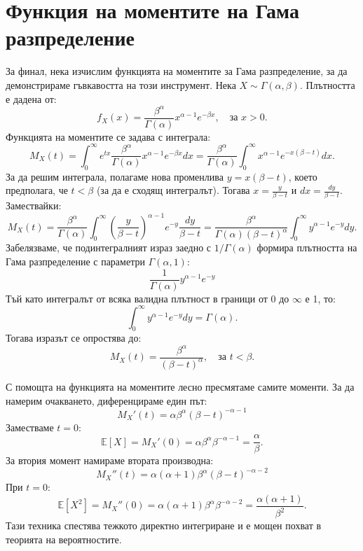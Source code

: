 \documentclass{article}
\begin{document}
\section{Функция на моментите на Гама разпределение}

За финал, нека изчислим функцията на моментите за Гама разпределение, за да демонстрираме гъвкавостта на този инструмент. Нека $X \sim \Gamma(\alpha, \beta)$. Плътността е дадена от:
\[ f_X(x) = \frac{\beta^\alpha}{\Gamma(\alpha)} x^{\alpha-1} e^{-\beta x}, \quad \text{за } x > 0. \]
Функцията на моментите се задава с интеграла:
\[ M_X(t) = \int_0^\infty e^{tx} \frac{\beta^\alpha}{\Gamma(\alpha)} x^{\alpha-1} e^{-\beta x} dx = \frac{\beta^\alpha}{\Gamma(\alpha)} \int_0^\infty x^{\alpha-1} e^{-x(\beta-t)} dx. \]
За да решим интеграла, полагаме нова променлива $y = x(\beta-t)$, което предполага, че $t < \beta$ (за да е сходящ интегралът). Тогава $x = \frac{y}{\beta-t}$ и $dx = \frac{dy}{\beta-t}$. Замествайки:
\[ M_X(t) = \frac{\beta^\alpha}{\Gamma(\alpha)} \int_0^\infty \left( \frac{y}{\beta-t} \right)^{\alpha-1} e^{-y} \frac{dy}{\beta-t} = \frac{\beta^\alpha}{\Gamma(\alpha)(\beta-t)^\alpha} \int_0^\infty y^{\alpha-1} e^{-y} dy. \]
Забелязваме, че подинтегралният израз заедно с $1/\Gamma(\alpha)$ формира плътността на Гама разпределение с параметри $\Gamma(\alpha, 1)$:
\[ \frac{1}{\Gamma(\alpha)} y^{\alpha-1} e^{-y} \]
Тъй като интегралът от всяка валидна плътност в граници от $0$ до $\infty$ е 1, то:
\[ \int_0^\infty y^{\alpha-1} e^{-y} dy = \Gamma(\alpha). \]
Тогава изразът се опростява до:
\[ M_X(t) = \frac{\beta^\alpha}{(\beta-t)^\alpha}, \quad \text{за } t < \beta. \]

С помощта на функцията на моментите лесно пресмятаме самите моменти. За да намерим очакването, диференцираме един път:
\[ M_X'(t) = \alpha \beta^\alpha (\beta-t)^{-\alpha-1} \]
Заместваме $t=0$:
\[ \mathbb{E}[X] = M_X'(0) = \alpha \beta^\alpha \beta^{-\alpha-1} = \frac{\alpha}{\beta}. \]
За втория момент намираме втората производна:
\[ M_X''(t) = \alpha(\alpha+1) \beta^\alpha (\beta-t)^{-\alpha-2} \]
При $t=0$:
\[ \mathbb{E}[X^2] = M_X''(0) = \alpha(\alpha+1) \beta^\alpha \beta^{-\alpha-2} = \frac{\alpha(\alpha+1)}{\beta^2}. \]
Тази техника спестява тежкото директно интегриране и е мощен похват в теорията на вероятностите.
\end{document}
